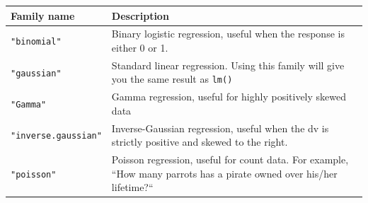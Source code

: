 \documentclass[]{book}
\theoremstyle{definition}
\theoremstyle{definition}
\theoremstyle{remark}
\begin{document}
\begin{longtable}[]{@{}ll@{}}
\toprule
\begin{minipage}[b]{0.18\columnwidth}\raggedright\strut
Family name\strut
\end{minipage} & \begin{minipage}[b]{0.67\columnwidth}\raggedright\strut
Description\strut
\end{minipage}\tabularnewline
\midrule
\endhead
\begin{minipage}[t]{0.18\columnwidth}\raggedright\strut
\texttt{"binomial"}\strut
\end{minipage} & \begin{minipage}[t]{0.67\columnwidth}\raggedright\strut
Binary logistic regression, useful when the response is either 0 or
1.\strut
\end{minipage}\tabularnewline
\begin{minipage}[t]{0.18\columnwidth}\raggedright\strut
\texttt{"gaussian"}\strut
\end{minipage} & \begin{minipage}[t]{0.67\columnwidth}\raggedright\strut
Standard linear regression. Using this family will give you the same
result as \texttt{lm()}\strut
\end{minipage}\tabularnewline
\begin{minipage}[t]{0.18\columnwidth}\raggedright\strut
\texttt{"Gamma"}\strut
\end{minipage} & \begin{minipage}[t]{0.67\columnwidth}\raggedright\strut
Gamma regression, useful for highly positively skewed data\strut
\end{minipage}\tabularnewline
\begin{minipage}[t]{0.18\columnwidth}\raggedright\strut
\texttt{"inverse.gaussian"}\strut
\end{minipage} & \begin{minipage}[t]{0.67\columnwidth}\raggedright\strut
Inverse-Gaussian regression, useful when the dv is strictly positive and
skewed to the right.\strut
\end{minipage}\tabularnewline
\begin{minipage}[t]{0.18\columnwidth}\raggedright\strut
\texttt{"poisson"}\strut
\end{minipage} & \begin{minipage}[t]{0.67\columnwidth}\raggedright\strut
Poisson regression, useful for count data. For example, ``How many
parrots has a pirate owned over his/her lifetime?``\strut
\end{minipage}\tabularnewline
\bottomrule
\end{longtable}
\end{document}
